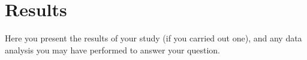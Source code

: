 \chapter{Results}
\label{sec:Results}

Here you present the results of your study (if you carried out one), and any data analysis you may have performed to answer your question.
